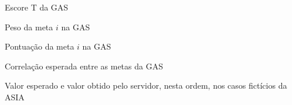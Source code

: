 \begin{simbolos}
  \item[$ T $] Escore T da GAS
  \item[$ w_i $] Peso da meta $i$ na GAS
  \item[$ x_i $] Pontuação da meta $i$ na GAS
  \item[$ \rho $] Correlação esperada entre as metas da GAS
  \item[$ \to $] Valor esperado e valor obtido pelo servidor, nesta ordem, nos casos fictícios da ASIA
\end{simbolos}
